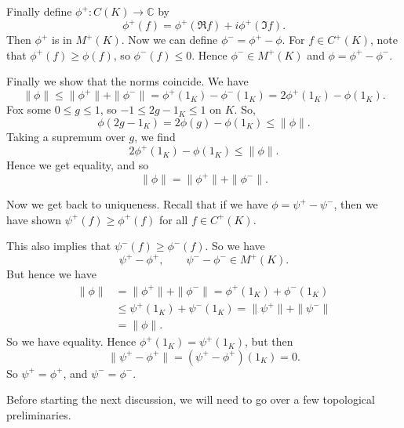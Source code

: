\documentclass[12pt]{article}
\begin{document}
\begin{proofbox}
	Finally define $\phi^{+} : C(K) \to \mathbb{C}$ by
	\[
	\phi^{+}(f) = \phi^{+}(\Re f) + i \phi^{+}(\Im f).
	\]
	Then $\phi^{+}$ is in $M^{+}(K)$. Now we can define $\phi^{-} = \phi^{+} - \phi$. For $f \in C^{+}(K)$, note that $\phi^{+}(f) \geq \phi(f)$, so $\phi^{-}(f) \leq 0$. Hence $\phi^{-} \in M^{+}(K)$ and $\phi = \phi^{+} - \phi^{-}$.

	Finally we show that the norms coincide. We have
	\[
	\|\phi\| \leq \|\phi^{+}\| + \|\phi^{-}\| = \phi^{+}(1_K) - \phi^{-}(1_K) = 2 \phi^{+}(1_K) - \phi(1_K).
	\]
	Fox some $0 \leq g \leq 1$, so $-1 \leq 2g - 1_K \leq 1$ on $K$. So,
	\[
	\phi(2g - 1_K) = 2\phi(g) - \phi(1_K) \leq \|\phi\|.
	\]
	Taking a supremum over $g$, we find
	\[
	2 \phi^{+}(1_K) - \phi(1_K) \leq \|\phi\|.
	\]
	Hence we get equality, and so
	\[
	\|\phi\| = \|\phi^{+}\| + \|\phi^{-}\|.
	\]

	Now we get back to uniqueness. Recall that if we have $\phi = \psi^{+} - \psi^{-}$, then we have shown $\psi^{+}(f) \geq \phi^{+}(f)$ for all $f \in C^{+}(K)$.

	This also implies that $\psi^{-}(f) \geq \phi^{-}(f)$. So we have
	\[
	\psi^{+} - \phi^{+}, \qquad \psi^{-} - \phi^{-} \in M^{+}(K).
	\]
	But hence we have
	\begin{align*}
		\|\phi\| &= \|\phi^{+}\| + \|\phi^{-}\| = \phi^+(1_K) + \phi^{-}(1_K) \\
			 &\leq \psi^+(1_K) + \psi^{-}(1_K) = \|\psi^{+}\| + \|\psi^{-}\| \\
			 &= \|\phi\|.
	\end{align*}
	So we have equality. Hence $\phi^{+}(1_K) = \psi^{+}(1_K)$, but then
	\[
	\|\psi^{+} - \phi^{+}\| = (\psi^{+} - \phi^{+})(1_K) = 0.
	\]
	So $\psi^{+} = \phi^{+}$, and $\psi^{-} = \phi^{-}$.
\end{proofbox}

Before starting the next discussion, we will need to go over a few topological preliminaries.
\end{document}
